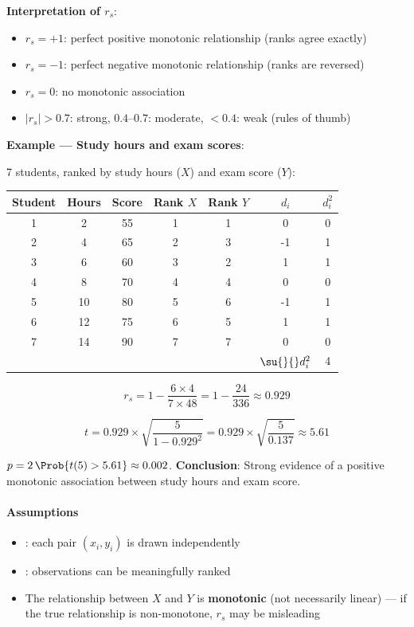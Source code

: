 \textbf{Interpretation of $r_s$}:
\begin{itemize}
    \item $r_s = +1$: perfect positive monotonic relationship (ranks agree exactly)
    \item $r_s = -1$: perfect negative monotonic relationship (ranks are reversed)
    \item $r_s = 0$: no monotonic association
    \item $|r_s| > 0.7$: strong, $0.4$--$0.7$: moderate, $< 0.4$: weak (rules of thumb)
\end{itemize}

\textbf{Example — Study hours and exam scores}:

7 students, ranked by study hours ($X$) and exam score ($Y$):

\begin{center}
\begin{tabular}{|c|c|c|c|c|c|c|}
    \hline
    \textbf{Student} & \textbf{Hours} & \textbf{Score} &
    \textbf{Rank $X$} & \textbf{Rank $Y$} & $d_i$ & $d_i^2$ \\
    \hline
    1 & 2  & 55 & 1 & 1 &  0 & 0 \\
    2 & 4  & 65 & 2 & 3 & -1 & 1 \\
    3 & 6  & 60 & 3 & 2 &  1 & 1 \\
    4 & 8  & 70 & 4 & 4 &  0 & 0 \\
    5 & 10 & 80 & 5 & 6 & -1 & 1 \\
    6 & 12 & 75 & 6 & 5 &  1 & 1 \\
    7 & 14 & 90 & 7 & 7 &  0 & 0 \\
    \hline
    & & & & & $\su{}{}d_i^2$ & 4 \\
    \hline
\end{tabular}
\end{center}

$$r_s = 1 - \frac{6 \times 4}{7 \times 48} = 1 - \frac{24}{336} \approx 0.929$$

$$t = 0.929 \times \sqrt{\frac{5}{1 - 0.929^2}} = 0.929 \times \sqrt{\frac{5}{0.137}} \approx 5.61$$

$p = 2\,\Prob{t(5) > 5.61} \approx 0.002$. \textbf{Conclusion}: Strong evidence of a
positive monotonic association between study hours and exam score.

\paragraph{Assumptions}
\begin{itemize}
    \item {}: each pair $(x_i, y_i)$ is drawn independently
    \item {}: observations can be meaningfully ranked
    \item The relationship between $X$ and $Y$ is \textbf{monotonic} (not necessarily
        linear) — if the true relationship is non-monotone, $r_s$ may be misleading
\end{itemize}

